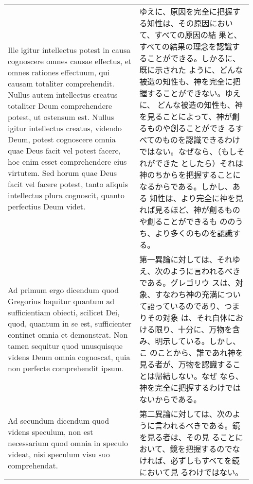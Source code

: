 \documentclass[10pt]{jsarticle} %
\begin{document}
\begin{longtable}{p{21em}p{21em}}
\\


Ille igitur intellectus potest in causa cognoscere omnes causae
effectus, et omnes rationes effectuum, qui causam totaliter
comprehendit. Nullus autem intellectus creatus totaliter Deum
comprehendere potest, ut ostensum est. Nullus igitur intellectus
creatus, videndo Deum, potest cognoscere omnia quae Deus facit vel
potest facere, hoc enim esset comprehendere eius virtutem. Sed horum
quae Deus facit vel facere potest, tanto aliquis intellectus plura
cognoscit, quanto perfectius Deum videt.


&

ゆえに、原因を完全に把握する知性は、その原因において、すべての原因の結
果と、すべての結果の理念を認識することができる。しかるに、既に示された
ように、どんな被造の知性も、神を完全に把握することができない。ゆえに、
どんな被造の知性も、神を見ることによって、神が創るものや創ることができ
るすべてのものを認識できるわけではない。なぜなら、（もしそれができた
としたら）それは神のちからを把握することになるからである。しかし、ある
知性は、より完全に神を見れば見るほど、神が創るものや創ることができるも
ののうち、より多くのものを認識する。

\\


{\sc Ad primum ergo dicendum} quod Gregorius loquitur quantum ad
sufficientiam obiecti, scilicet Dei, quod, quantum in se est,
sufficienter continet omnia et demonstrat. Non tamen sequitur quod
unusquisque videns Deum omnia cognoscat, quia non perfecte
comprehendit ipsum.


&

第一異論に対しては、それゆえ、次のように言われるべきである。グレゴリウ
スは、対象、すなわち神の充満について語っているのであり、つまりその対象
は、それ自体における限り、十分に、万物を含み、明示している。しかし、こ
のことから、誰であれ神を見る者が、万物を認識することは帰結しない。なぜ
なら、神を完全に把握するわけではないからである。

\\


{\sc  Ad secundum dicendum} quod videns speculum, non est
 necessarium quod omnia in speculo videat, nisi speculum visu suo
 comprehendat.


&

第二異論に対しては、次のように言われるべきである。鏡を見る者は、その見
ることにおいて、鏡を把握するのでなければ、必ずしもすべてを鏡において見
るわけではない。

\\



\end{longtable}
\end{document}
